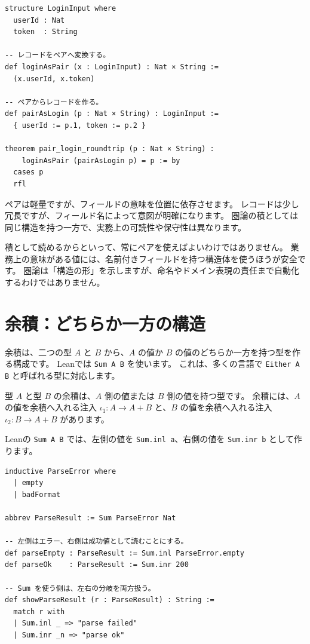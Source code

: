 \begin{listing}[htbp]
\begin{verbatim}
structure LoginInput where
  userId : Nat
  token  : String

-- レコードをペアへ変換する。
def loginAsPair (x : LoginInput) : Nat × String :=
  (x.userId, x.token)

-- ペアからレコードを作る。
def pairAsLogin (p : Nat × String) : LoginInput :=
  { userId := p.1, token := p.2 }

theorem pair_login_roundtrip (p : Nat × String) :
    loginAsPair (pairAsLogin p) = p := by
  cases p
  rfl
\end{verbatim}
\caption{\texttt{LoginInput} と \texttt{Nat × String}}
\label{lst:ch13_record_as_product}
\end{listing}

ペアは軽量ですが、フィールドの意味を位置に依存させます。
レコードは少し冗長ですが、フィールド名によって意図が明確になります。
圏論の積としては同じ構造を持つ一方で、実務上の可読性や保守性は異なります。

積として読めるからといって、常にペアを使えばよいわけではありません。
業務上の意味がある値には、名前付きフィールドを持つ構造体を使うほうが安全です。
圏論は「構造の形」を示しますが、命名やドメイン表現の責任まで自動化するわけではありません。

\section{余積：どちらか一方の構造}
\label{sec:ch13-coproduct}

余積は、二つの型 \(A\) と \(B\) から、\(A\) の値か \(B\) の値のどちらか一方を持つ型を作る構成です。
Leanでは \texttt{Sum A B} を使います。
これは、多くの言語で \texttt{Either A B} と呼ばれる型に対応します。

型 \(A\) と型 \(B\) の余積は、\(A\) 側の値または \(B\) 側の値を持つ型です。
余積には、\(A\) の値を余積へ入れる注入 \(\iota_1 : A \to A + B\) と、\(B\) の値を余積へ入れる注入 \(\iota_2 : B \to A + B\) があります。

Leanの \texttt{Sum A B} では、左側の値を \texttt{Sum.inl a}、右側の値を \texttt{Sum.inr b} として作ります。

\begin{listing}[htbp]
\begin{verbatim}
inductive ParseError where
  | empty
  | badFormat

abbrev ParseResult := Sum ParseError Nat

-- 左側はエラー、右側は成功値として読むことにする。
def parseEmpty : ParseResult := Sum.inl ParseError.empty
def parseOk    : ParseResult := Sum.inr 200

-- Sum を使う側は、左右の分岐を両方扱う。
def showParseResult (r : ParseResult) : String :=
  match r with
  | Sum.inl _ => "parse failed"
  | Sum.inr _n => "parse ok"
\end{verbatim}
\caption{\texttt{ParseResult}}
\label{lst:ch13_sum_basic}
\end{listing}

